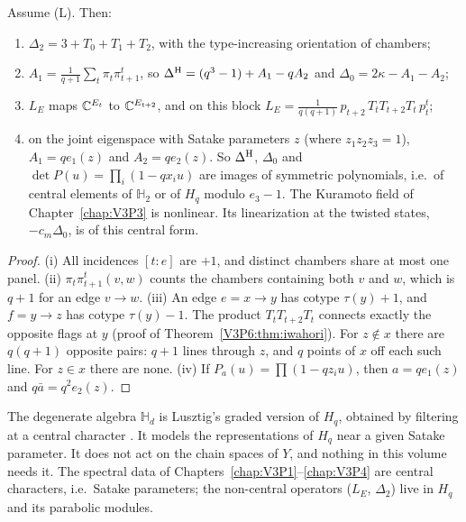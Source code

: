 \begin{theorem}\label{V3P6:thm:ops}
Assume \textup{(L)}. Then:
\begin{enumerate}
\item[(i)] $\Delta_2=3+T_0+T_1+T_2$, with the type-increasing orientation of chambers;
\item[(ii)] $A_1=\frac1{q+1}\sum_t\pi_t\pi_{t+1}^{t}$, so $\Delta^{\mathrm{H}}=(q^{3}-1)+A_1-qA_2$ and
$\Delta_0=2\kappa-A_1-A_2$;
\item[(iii)] $L_E$ maps $\mathbb{C}^{E_t}$ to $\mathbb{C}^{E_{t+2}}$, and on this block
$L_E=\frac1{q(q+1)}\,p_{t+2}\,T_tT_{t+2}T_t\,p_t^{t}$;
\item[(iv)] on the joint eigenspace with Satake parameters $z$ (where $z_1z_2z_3=1$), $A_1=qe_1(z)$
and $A_2=qe_2(z)$. So $\Delta^{\mathrm{H}}$, $\Delta_0$ and $\det P(u)=\prod_i(1-qx_iu)$ are images of
symmetric polynomials, i.e.\ of central elements of $\mathbb H_2$ or of $H_q$ modulo $e_3-1$.
The Kuramoto field of Chapter~\ref{chap:V3P3} is nonlinear. Its linearization at the twisted states,
$-c_m\Delta_0$, is of this central form.
\end{enumerate}
\end{theorem}

\begin{proof}
(i) All incidences $[t:e]$ are $+1$, and distinct chambers share at most one panel.
(ii) $\pi_t\pi_{t+1}^{t}(v,w)$ counts the chambers containing both $v$ and $w$, which is
$q+1$ for an edge $v\to w$. (iii) An edge $e=x\to y$ has cotype $\tau(y)+1$, and $f=y\to z$ has
cotype $\tau(y)-1$. The product $T_tT_{t+2}T_t$ connects exactly the opposite flags at $y$
(proof of Theorem~\ref{V3P6:thm:iwahori}). For $z\notin x$ there are $q(q+1)$ opposite pairs:
$q+1$ lines through $z$, and $q$ points of $x$ off each such line. For $z\in x$ there are none.
(iv) If $P_a(u)=\prod(1-qz_iu)$, then $a=qe_1(z)$ and $q\bar a=q^{2}e_2(z)$.
\end{proof}

\begin{remark}\label{V3P6:rem:graded}
The degenerate algebra $\mathbb H_d$ is Lusztig's graded version of $H_q$, obtained by
filtering at a central character \cite{Lus89}. It models the representations of $H_q$ near a
given Satake parameter. It does not act on the chain spaces of $Y$, and nothing in this volume
needs it. The spectral data of Chapters~\ref{chap:V3P1}--\ref{chap:V3P4} are central characters, i.e.\ Satake parameters; the
non-central operators ($L_E$, $\Delta_2$) live in $H_q$ and its parabolic modules.
\end{remark}

